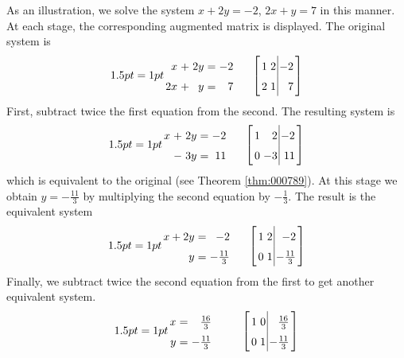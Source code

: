 As an illustration, we solve the system $x + 2y = -2$, $2x + y = 7$ in this manner. At each stage, the corresponding augmented matrix is displayed. The original system is
\begin{equation*}
\begin{array}{lcl}
\arraycolsep=1pt
\begin{array}{rlrcr}
x & + & 2y & = & -2 \\
2x & + & y & = & 7 
\end{array}
& \quad &
\leftB \begin{array}{rr|r}
1 & 2 & -2 \\
2 & 1 & 7
\end{array} \rightB
\end{array}
\end{equation*}
First, subtract twice the first equation from the second. The resulting system is
\begin{equation*}
\begin{array}{lcl}
\arraycolsep=1pt
\begin{array}{rlrcr}
x & + & 2y & = & -2 \\
 & - & 3y & = & 11 
\end{array}
& \quad &
\leftB \begin{array}{rr|r}
1 & 2 & -2 \\
0 & -3 & 11
\end{array} \rightB
\end{array}
\end{equation*}
which is equivalent to the original (see Theorem \ref{thm:000789}). At this stage we obtain $ y = -\frac{11}{3}$ by multiplying the second equation by $-\frac{1}{3}$. The result is the equivalent system
\begin{equation*}
\begin{array}{lcl}
\arraycolsep=1pt
\begin{array}{rcr}
x + 2y & = & -2 \\
    y & = & -\frac{11}{3}
\end{array}
& \quad & 
\leftB \begin{array}{rr|r}
1 & 2 & -2 \\
0 & 1 & -\frac{11}{3}
\end{array} \rightB
\end{array}
\end{equation*}
Finally, we subtract twice the second equation from the first to get another equivalent system.
\begin{equation*}
\begin{array}{lcl}
\def\arraystretch{1.5}
\arraycolsep=1pt
\begin{array}{rcr} 
x & = & \frac{16}{3} \\
y & = & -\frac{11}{3}
\end{array}
& \quad \quad &
\def\arraystretch{1.5}
\leftB \begin{array}{rr|r}
1 & 0 & \frac{16}{3} \\
0 & 1 & -\frac{11}{3}
\end{array} \rightB
\end{array}
\end{equation*}
